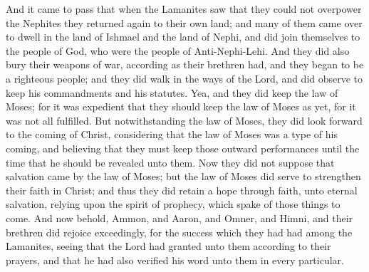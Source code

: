 And it came to pass that when the Lamanites saw that they could not overpower the Nephites they returned again to their own land; and many of them came over to dwell in the land of Ishmael and the land of Nephi, and did join themselves to the people of God, who were the people of Anti-Nephi-Lehi.
\bverse \iffalse And they did also bury their weapons of war, according as their brethren had, and they began to be a righteous people; and they did walk in the ways of the Lord, and did observe to keep his commandments and his statutes. \fi
And they did also bury their weapons of war, according as their brethren had, and they began to be a righteous people; and they did walk in the ways of the Lord, and did observe to keep his commandments and his statutes.
\bverse \iffalse Yea, and they did keep the law of Moses; for it was expedient that they should keep the law of Moses as yet, for it was not all fulfilled. But notwithstanding the law of Moses, they did look forward to the coming of Christ, considering that the law of Moses was a type of his coming, and believing that they must keep those outward performances until the time that he should be revealed unto them. \fi
Yea, and they did keep the law of Moses; for it was expedient that they should keep the law of Moses as yet, for it was not all fulfilled. But notwithstanding the law of Moses, they did look forward to the coming of Christ, considering that the law of Moses was a type of his coming, and believing that they must keep those outward performances until the time that he should be revealed unto them.
\bverse \iffalse Now they did not suppose that salvation came by the law of Moses; but the law of Moses did serve to strengthen their faith in Christ; and thus they did retain a hope through faith, unto eternal salvation, relying upon the spirit of prophecy, which spake of those things to come. \fi
Now they did not suppose that salvation came by the law of Moses; but the law of Moses did serve to strengthen their faith in Christ; and thus they did retain a hope through faith, unto eternal salvation, relying upon the spirit of prophecy, which spake of those things to come.
\bverse \iffalse And now behold, Ammon, and Aaron, and Omner, and Himni, and their brethren did rejoice exceedingly, for the success which they had had among the Lamanites, seeing that the Lord had granted unto them according to their prayers, and that he had also verified his word unto them in every particular. \fi
And now behold, Ammon, and Aaron, and Omner, and Himni, and their brethren did rejoice exceedingly, for the success which they had had among the Lamanites, seeing that the Lord had granted unto them according to their prayers, and that he had also verified his word unto them in every particular.
